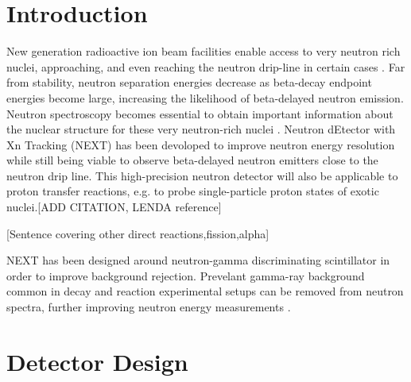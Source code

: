 \documentclass[preprint,3p,twocolumn]{elsarticle}
\begin{document}

\section{Introduction}
New generation radioactive ion beam facilities enable access to very neutron rich nuclei, approaching, and even reaching the neutron drip-line in certain
cases \cite{FRIB}.
Far from stability, neutron separation energies decrease as beta-decay endpoint energies become large, increasing the likelihood of beta-delayed neutron emission. Neutron spectroscopy becomes essential to obtain important information about the nuclear structure for these very neutron-rich nuclei \cite{RevModPhys.84.567,NAKAMURA201753,BLANK2008403}. 
Neutron dEtector with Xn Tracking (NEXT) has been devoloped to improve neutron energy resolution while still being viable to observe beta-delayed neutron emitters close to the neutron drip line. 
This high-precision neutron detector will also be applicable to proton transfer reactions, e.g. to probe single-particle proton states of exotic nuclei.[ADD CITATION, LENDA reference]
\begin{center}
[Sentence covering other direct reactions,fission,alpha]
\end{center}
NEXT has been designed around neutron-gamma discriminating scintillator in order to improve background rejection. Prevelant gamma-ray background common in decay and reaction experimental setups can be removed from neutron spectra, further improving neutron energy measurements \cite{FEBBRARO2018189}.


\section{Detector Design}
\end{document}
